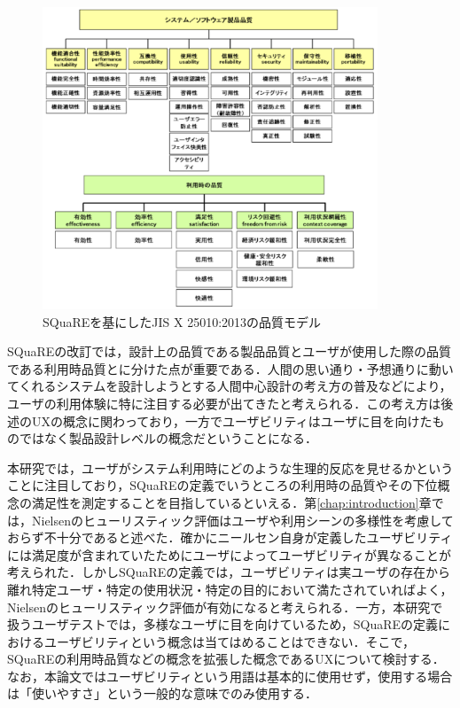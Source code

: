 \begin{figure}[htbp]
  \begin{minipage}{\hsize}
    \begin{center}
       \includegraphics[width=100mm]{img/square.png}
    \end{center}
    \caption{SQuaREを基にしたJIS X 25010:2013の品質モデル}
    \label{fig:square}
  \end{minipage}
\end{figure}

SQuaREの改訂\cite{iso25010}では，設計上の品質である製品品質とユーザが使用した際の品質である利用時品質とに分けた点が重要である．人間の思い通り・予想通りに動いてくれるシステムを設計しようとする人間中心設計\cite{kurosu2013}の考え方の普及などにより，ユーザの利用体験に特に注目する必要が出てきたと考えられる．この考え方は後述のUXの概念に関わっており，一方でユーザビリティはユーザに目を向けたものではなく製品設計レベルの概念だということになる．

本研究では，ユーザがシステム利用時にどのような生理的反応を見せるかということに注目しており，SQuaREの定義でいうところの利用時の品質やその下位概念の満足性を測定することを目指しているといえる．第\ref{chap:introduction}章では，Nielsenのヒューリスティック評価はユーザや利用シーンの多様性を考慮しておらず不十分であると述べた．確かにニールセン自身が定義したユーザビリティには満足度が含まれていたためにユーザによってユーザビリティが異なることが考えられた．しかしSQuaREの定義では，ユーザビリティは実ユーザの存在から離れ特定ユーザ・特定の使用状況・特定の目的において満たされていればよく，Nielsenのヒューリスティック評価が有効になると考えられる．一方，本研究で扱うユーザテストでは，多様なユーザに目を向けているため，SQuaREの定義におけるユーザビリティという概念は当てはめることはできない．そこで，SQuaREの利用時品質などの概念を拡張した概念であるUXについて検討する．なお，本論文ではユーザビリティという用語は基本的に使用せず，使用する場合は「使いやすさ」という一般的な意味でのみ使用する．

